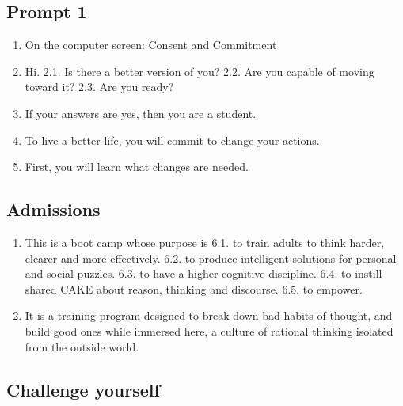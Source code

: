 \documentclass[
]{book}
\providecommand{\tightlist}{%
  \setlength{\itemsep}{0pt}\setlength{\parskip}{0pt}}
\begin{document}
\hypertarget{prompt-1}{%
\subsection{Prompt 1}\label{prompt-1}}

\begin{enumerate}
\def\labelenumi{\arabic{enumi}.}
\tightlist
\item
  On the computer screen:
  Consent and Commitment
\item
  Hi.
  2.1. Is there a better version of you?
  2.2. Are you capable of moving toward it?
  2.3. Are you ready?
\item
  If your answers are yes, then you are a student.
\item
  To live a better life, you will commit to change your actions.
\item
  First, you will learn what changes are needed.
\end{enumerate}

\hypertarget{admissions}{%
\subsection{Admissions}\label{admissions}}

\begin{enumerate}
\def\labelenumi{\arabic{enumi}.}
\setcounter{enumi}{5}
\tightlist
\item
  This is a boot camp whose purpose is
  6.1. to train adults to think harder, clearer and more effectively.
  6.2. to produce intelligent solutions for personal and social puzzles.
  6.3. to have a higher cognitive discipline.
  6.4. to instill shared CAKE about reason, thinking and discourse.
  6.5. to empower.
\item
  It is a training program designed to break down bad habits of thought, and build
  good ones while immersed here, a culture of rational thinking isolated from the
  outside world.
\end{enumerate}

\hypertarget{challenge-yourself}{%
\subsection{Challenge yourself}\label{challenge-yourself}}
\end{document}
